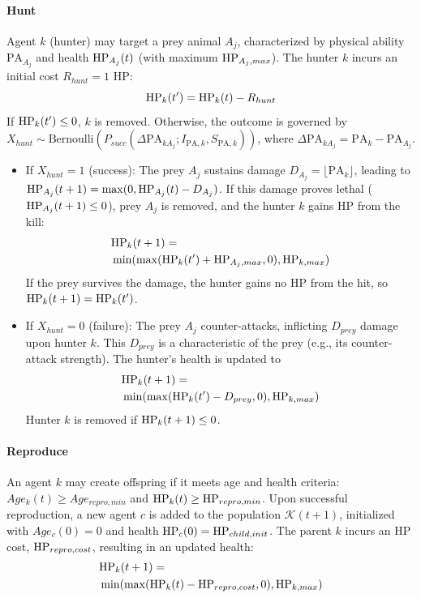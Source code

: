 \paragraph{Hunt}
Agent $k$ (hunter) may target a prey animal $A_j$, characterized by physical ability $\mathrm{PA}_{A_j}$ and health $\mathrm{HP}_{A_j}(t)$ (with maximum $\mathrm{HP}_{A_j,max}$). The hunter $k$ incurs an initial cost $R_{hunt}=1$ HP:
$$ \mathrm{HP}_k(t') = \mathrm{HP}_k(t) - R_{hunt} $$
If $\mathrm{HP}_k(t') \le 0$, $k$ is removed. Otherwise, the outcome is governed by $X_{hunt} \sim \text{Bernoulli}(P_{succ}(\Delta \mathrm{PA}_{kA_j}; I_{\mathrm{PA},k}, S_{\mathrm{PA},k}))$, where $\Delta \mathrm{PA}_{kA_j} = \mathrm{PA}_k - \mathrm{PA}_{A_j}$.
\begin{itemize}
    \item If $X_{hunt}=1$ (success): The prey $A_j$ sustains damage $D_{A_j} = \lfloor \mathrm{PA}_k \rfloor$, leading to $\mathrm{HP}_{A_j}(t+1) = \max(0, \mathrm{HP}_{A_j}(t) - D_{A_j})$.
        If this damage proves lethal ($\mathrm{HP}_{A_j}(t+1) \le 0$), prey $A_j$ is removed, and the hunter $k$ gains HP from the kill: 
        \begin{align*}
        &\mathrm{HP}_k(t+1) = \\&\min(\max(\mathrm{HP}_k(t') + \mathrm{HP}_{A_j,max}, 0), \mathrm{HP}_{k,max})
        \end{align*}
        If the prey survives the damage, the hunter gains no HP from the hit, so $\mathrm{HP}_k(t+1) = \mathrm{HP}_k(t')$.
    \item If $X_{hunt}=0$ (failure): The prey $A_j$ counter-attacks, inflicting $D_{prey}$ damage upon hunter $k$. This $D_{prey}$ is a characteristic of the prey (e.g., its counter-attack strength). The hunter's health is updated to 
        \begin{align*}
        &\mathrm{HP}_k(t+1) = \\&\min(\max(\mathrm{HP}_k(t') - D_{prey}, 0), \mathrm{HP}_{k,max})
        \end{align*}
        Hunter $k$ is removed if $\mathrm{HP}_k(t+1) \le 0$.
\end{itemize}

\paragraph{Reproduce}
An agent $k$ may create offspring if it meets age and health criteria: $Age_k(t) \ge Age_{repro,min}$ and $\mathrm{HP}_k(t) \ge \mathrm{HP}_{repro,min}$. Upon successful reproduction, a new agent $c$ is added to the population $\mathcal{K}(t+1)$, initialized with $Age_c(0)=0$ and health $\mathrm{HP}_c(0) = \mathrm{HP}_{child,init}$. The parent $k$ incurs an HP cost, $\mathrm{HP}_{repro,cost}$, resulting in an updated health:
\begin{align*}
    &\mathrm{HP}_k(t+1) = \\&\min(\max(\mathrm{HP}_k(t) - \mathrm{HP}_{repro,cost}, 0), \mathrm{HP}_{k,max})
\end{align*}

